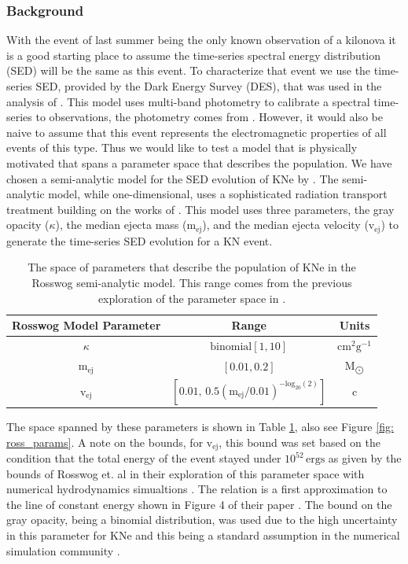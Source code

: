 \subsubsection{Background}
With the event of last summer being the only known observation of a kilonova it is a good starting place to assume the time-series spectral energy distribution (SED) will be the same as this event. To characterize that event we use the time-series SED, provided by the Dark Energy Survey (DES), that was used in the analysis of \citep{Scolnic2017a}. This model uses multi-band photometry to calibrate a spectral time-series to observations, the photometry comes from \citep{Soares-Santos2017, Cowperthwaite2017}. However, it would also be naive to assume that this event represents the electromagnetic properties of all events of this type. Thus we would like to test a model that is physically motivated that spans a parameter space that describes the population. We have chosen a semi-analytic model for the SED evolution of KNe by \citep{Rosswog2018}. The semi-analytic model, while one-dimensional, uses a sophisticated radiation transport treatment building on the works of \citep{Wollaeger2017, Pinto2000}. This model uses three parameters, the gray opacity ($\kappa$), the median ejecta mass ($\mathrm{m_{ej}}$), and the median ejecta velocity ($\mathrm{v_{ej}}$) to generate the time-series SED evolution for a KN event. \par
\begin{table}[h!]
  \centering
  \begin{tabular}{c|c|c}
    Rosswog Model Parameter & Range & Units \\
    \hline
    $\kappa$ & $\mathrm{binomial}[1, 10]$ & $\mathrm{cm^2 g^{-1}}$ \\
    \hline
    $\mathrm{m_{ej}}$ & $[0.01, 0.2]$ & $\mathrm{M_{\bigodot}}$ \\
    \hline
    $\mathrm{v_{ej}}$ & $[0.01, \, 0.5 (\mathrm{m_{ej}}/0.01)^{-\mathrm{log}_{20}(2)}]$ & c
  \end{tabular}
  \caption{The space of parameters that describe the population of KNe in the Rosswog semi-analytic model. This range comes from the previous exploration of the parameter space in \citep{Rosswog2016a}.}
  \label{tab: ross_params}
\end{table}

The space spanned by these parameters is shown in Table \ref{tab: ross_params}, also see Figure \ref{fig: ross_params}. A note on the bounds, for $\mathrm{v_{ej}}$, this bound was set based on the condition that the total energy of the event stayed under $10^{52}\, \mathrm{ergs}$ as given by the bounds of Rosswog et. al in their exploration of this parameter space with numerical hydrodynamics simualtions \citep{Rosswog2016a}. The relation is a first approximation to the line of constant energy shown in Figure 4 of their paper \citep{Rosswog2016a}. The bound on the gray opacity, being a binomial distribution, was used due to the high uncertainty in this parameter for KNe \citep{Kasen2013} and this being a standard assumption in the numerical simulation community \citep{Rosswog2018}.\par

